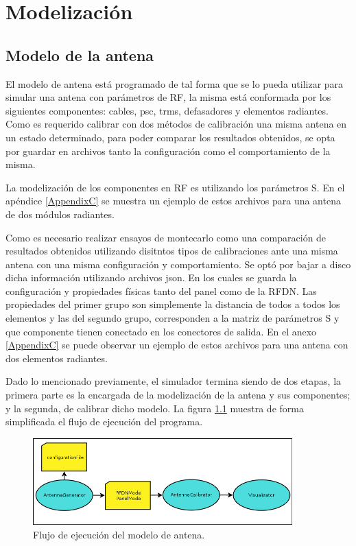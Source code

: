 \chapter{Modelización}
\label{ch:modelizacion}

\section{Modelo de la antena}

El modelo de antena está programado de tal forma que se lo pueda utilizar para simular una antena con parámetros de RF,
la misma está conformada por los siguientes componentes: cables, psc, trms, defasadores y elementos radiantes. Como es 
requerido calibrar con dos métodos de calibración una misma antena en un estado determinado, para poder comparar los resultados
obtenidos, se opta por guardar en archivos tanto la configuración como el comportamiento de la misma. 

La modelizaci\'on de los componentes en RF es utilizando los par\'ametros S. En el apéndice \ref{AppendixC} se muestra un 
ejemplo de estos archivos para una antena de dos módulos radiantes.

Como es necesario realizar ensayos de montecarlo como una comparación de resultados obtenidos utilizando disitntos tipos de 
calibraciones ante una misma antena con una misma configuración y comportamiento. Se optó por bajar a disco dicha información
utilizando archivos json. En los cuales se guarda la configuración y propiedades físicas tanto del panel como de la RFDN. Las
propiedades del primer grupo son simplemente la distancia de todos a todos los elementos y las del segundo grupo, corresponden
a la matriz de parámetros S y que componente tienen conectado en los conectores de salida. En el anexo \ref{AppendixC} se puede
observar un ejemplo de estos archivos para una antena con dos elementos radiantes.

Dado lo mencionado previamente, el simulador termina siendo de dos etapas, la primera parte es la encargada de la modelización
de la antena y sus componentes; y la segunda, de calibrar dicho modelo. La figura \ref{fig:prog_inic} muestra de forma 
simplificada el flujo de ejecuci\'on del programa.

\begin{figure}
 \centering
 \includegraphics[width=10cm]{gfx/FlujoEjecucion.png}
 \caption{Flujo de ejecuci\'on del modelo de antena.}
 \label{fig:prog_inic}
\end{figure}


